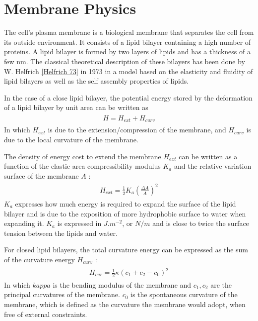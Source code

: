 \documentclass[A4paperpaper,11pt,english]{sphinxmanual}
\begin{document}
\section{Membrane Physics}
\label{index-latex:membrane-physics}
The cell's plasma membrane is a biological membrane that separates the cell from
its outside environment.  It consists of a lipid bilayer containing
a high number of proteins.  A lipid bilayer is formed by two layers of lipids and has a
thickness of a few nm. The classical theoretical description
of these bilayers has been done by W. Helfrich {\hyperref[index-latex:helfrich]{{[}Helfrich 73{]}}} in 1973 in a
model based on the elasticity and fluidity of lipid bilayers as well as the
self assembly properties of  lipids.

In the case of a close lipid bilayer, the potential energy stored by the
deformation of a lipid bilayer by unit area can be  written as
\label{index-latex:equation-eqa1}\begin{gather}
\begin{split}H = H_{ext} + H_{curv}\end{split}\label{index-latex-eqa1}
\end{gather}
In which \(H_{ext}\) is due to the extension/compression of the membrane,
and \(H_{curv}\) is due to the local curvature of the membrane.

The density of energy cost to extend the membrane \(H_{ext}\) can be written as a
function  of the elastic area compressibility modulus \(K_a\) and the
relative variation surface of the membrane \(A\) :
\label{index-latex:equation-eqa2}\begin{gather}
\begin{split}H_{ext} = \frac 1 2 K_a \left(\frac{\Delta A}{A}\right)^2\end{split}\label{index-latex-eqa2}
\end{gather}
\(K_a\) expresses how much energy is required to expand the surface of the
lipid bilayer and is due to the exposition of more hydrophobic surface to water
when expanding it. \(K_a\) is expressed in \(J.m^{-2}\), or \(N/m\)
and is close to twice the surface tension between the lipids and water.

For closed lipid bilayers, the total curvature energy can be expressed as the
sum of the curvature energy \(H_{curv}\) :
\label{index-latex:equation-eqa3}\begin{gather}
\begin{split}H_{cur} = \frac 1 2 \kappa (c_1 + c_2 -c_0)^2\end{split}\label{index-latex-eqa3}
\end{gather}
In which \(kappa\) is the bending modulus of the membrane and \(c_1,c_2\)
are the principal curvatures of the membrane. \(c_0\) is the spontaneous
curvature of the membrane, which is defined as the curvature the membrane would adopt, when free of
external constraints.
\end{document}
